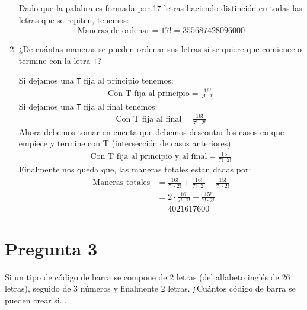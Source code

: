 \documentclass[spanish, fleqn]{article}
\begin{document}
\begin{enumerate}
    Dado que la palabra es formada por 17 letras haciendo distinción en todas las letras que se repiten, tenemos:
    \begin{align*}
    \text{Maneras de ordenar}=17!= 355687428096000
    \end{align*}
    \item ¿De cuántas maneras se pueden ordenar sus letras si se quiere que comience o termine con la letra \texttt{T}?
    
    Si dejamos una \texttt{T} fija al principio tenemos:
    \begin{align*}
    \text{Con T fija al principio}=\frac{16!}{7!\cdot 2!}
    \end{align*}
    Si dejamos una \texttt{T} fija al final tenemos:
    \begin{align*}
    \text{Con T fija al final}=\frac{16!}{7!\cdot 2!}
    \end{align*}
    Ahora debemos tomar en cuenta que debemos descontar los casos en que empiece y termine con T (intersección de casos anteriores):
    \begin{align*}
    \text{Con T fija al principio y al final}=\frac{15!}{7!\cdot 2!}
    \end{align*}
    Finalmente nos queda que, las maneras totales estan dadas por:
    \begin{align*}
    \text{Maneras totales}&=\frac{16!}{7!\cdot 2!} + \frac{16!}{7!\cdot 2!} - \frac{15!}{7!\cdot 2!}\\
    &=2 \cdot \frac{16!}{7!\cdot 2!} - \frac{15!}{7!\cdot 2!}\\
	&= 4021617600    
    \end{align*}
    \end{enumerate}
	\section*{Pregunta 3}
    Si un tipo de código de barra se compone de 2 letras 
    (del alfabeto inglés de 26 letras), seguido de 3 números 
    y finalmente 2 letras. ¿Cuántos código de barra se pueden
    crear si...
    
\end{document}
